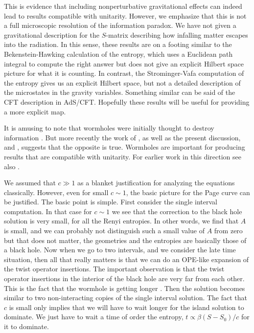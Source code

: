   This is evidence that including  nonperturbative gravitational effects can indeed lead to results compatible with unitarity.   However, we emphasize that this is not a full  microscopic resolution of the information paradox. We have not given a gravitational description for   the 
   $S$-matrix describing how infalling matter escapes into the radiation. 
   In this sense, these  results are on a footing similar to the Bekenstein-Hawking calculation of the entropy, which uses a Euclidean path integral to compute the right answer but does not give an explicit  Hilbert space picture for what it is counting. 
   In contrast, the Strominger-Vafa computation of the entropy \cite{Strominger:1996sh} gives us an explicit Hilbert space, but not a detailed description of the   microstates in the gravity variables.
    Something similar can be said of the CFT description in AdS/CFT. Hopefully these results will be useful for providing a more explicit map. 
   
   It is amusing to note that wormholes were initially thought to destroy information 
   \cite{Hawking:1987mz,Lavrelashvili:1987jg,Giddings:1987cg}. 
   But more recently the 
   work of \cite{Saad:2019lba,Saad:2019pqd},  as well as the present discussion, and \cite{Penington:2019kki}, suggests that the opposite is true. Wormholes are important for producing results that are compatible with unitarity. 
   For earlier work in this direction see also    \cite{Coleman:1988cy,Giddings:1988cx,Polchinski:1994zs}.
   


We assumed that $c\gg 1$ as a blanket justification for analyzing the equations classically. However, even for small $c \sim 1$, the basic picture for the Page curve can be justified. The basic point is simple. First consider the single interval computation. In that case for $c\sim 1$ we see that the correction to the black hole solution is very small, for all the Renyi entropies. In other words, we find that $A$ is small, and we can probably not distinguish such a small value of $A$ from zero but that does not matter, the geometries and the entropies are basically those of a black hole. Now when we go to two intervals, and we consider the late time situation, then all that really matters is that we can do an OPE-like expansion of the twist operator insertions. The important observation is that the twist operator insertions in the interior of the black hole are very far from each other. This is the fact that the wormhole is getting longer \cite{Hartman:2013qma,Susskind:2014moa}. Then the solution becomes similar to two non-interacting copies of the single interval solution.
The fact that $c$ is small only implies that we will have to wait longer for the island solution to dominate.  We just have to wait a time of order the entropy, $t \propto  {\beta } (S-S_0)/c$ for it to dominate.  

